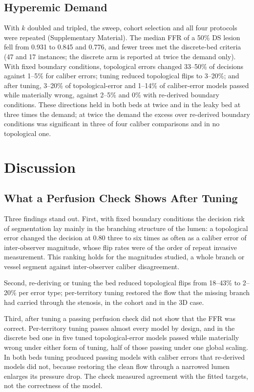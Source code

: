 \documentclass[journal]{IEEEtran}
\begin{document}
\subsection{Hyperemic Demand}\label{sec:demand}
With $k$ doubled and tripled, the sweep, cohort selection and all four protocols were repeated (Supplementary
Material). The median FFR of a 50\% DS lesion fell from 0.931 to 0.845 and 0.776, and fewer trees met the discrete-bed
criteria (47 and 17 instances; the discrete arm is reported at twice the demand only).
With fixed boundary conditions, topological errors changed 33--50\% of decisions against 1--5\% for caliber errors;
tuning reduced topological flips to 3--20\%; and after tuning, 3--20\% of topological-error and 1--14\% of
caliber-error models passed while materially wrong, against 2--5\% and 0\% with re-derived boundary conditions. These
directions held in both beds at twice and in the leaky bed at three times the demand; at twice the demand the
excess over re-derived boundary conditions was significant in three of four caliber comparisons and in no
topological one.

\section{Discussion}
\subsection{What a Perfusion Check Shows After Tuning}
Three findings stand out. First, with fixed boundary conditions the decision risk of segmentation lay mainly in the branching
structure of the lumen: a topological error changed the decision at 0.80 three to six times as often as a caliber
error of inter-observer magnitude, whose flip rates were of the order of repeat invasive measurement. This ranking
holds for the magnitudes studied, a whole branch or vessel segment against inter-observer caliber disagreement.

Second, re-deriving or tuning the bed reduced topological flips from 18--43\% to 2--20\% per error type; per-territory
tuning restored the flow that the missing branch had carried through the stenosis, in the cohort and in the 3D case.

Third, after tuning a passing perfusion check did not show that the FFR was correct. Per-territory tuning passes
almost every model by design, and in the discrete bed one in five tuned topological-error models passed while
materially wrong under either form of tuning, half of those passing under one global scaling. In both beds tuning produced passing models with
caliber errors that re-derived models did not, because restoring the clean flow through a narrowed lumen enlarges
its pressure drop. The check measured agreement with the fitted targets, not the correctness of the model.
\end{document}
